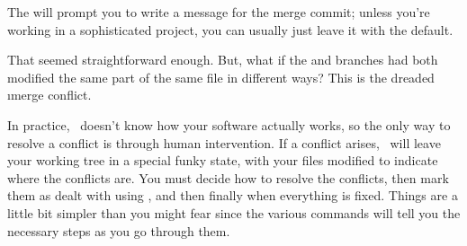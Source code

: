 \documentclass[letterpaper,12pt,titlepage,twoside]{article}
\begin{document}
The  will prompt you to write a message for the merge commit;
unless you're working in a sophisticated project, you can usually just leave
it with the default.

That seemed straightforward enough. But, what if the  and
 branches had both modified the same part of the same file in
different ways? This is the dreaded \i{merge conflict}.

In practice, \git\ doesn't know how your software actually works, so the only
way to resolve a conflict is through human intervention. If a conflict arises,
\git\ will leave your working tree in a special funky state, with your files
modified to indicate where the conflicts are. You must decide how to resolve
the conflicts, then mark them as dealt with using , and then finally
 when everything is fixed. Things are a little bit simpler than
you might fear since the various commands will tell you the necessary steps as
you go through them.
\end{document}
